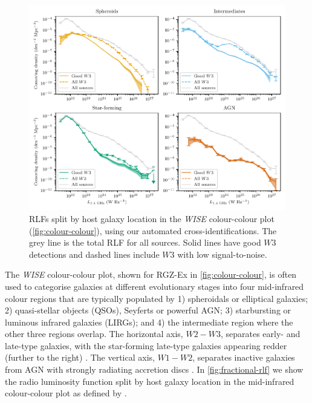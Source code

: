 \documentclass[11pt, a4paper]{book}
\begin{document}
  \begin{figure}
      \centering
    \includegraphics[width=\linewidth]{rlf-images/frlf-ir-colours.pdf}
    \caption[RLFs split by \emph{WISE} colour regions.]{RLFs split by host galaxy
      location in the \emph{WISE} colour-colour plot (\autoref{fig:colour-colour}),
      using our automated cross-identifications. The grey line is the
      total RLF for all sources. Solid lines have good $W3$ detections and dashed lines include $W3$ with low signal-to-noise.
    \label{fig:fractional-rlf}}
  \end{figure}

      The \emph{WISE} colour-colour plot, shown for RGZ-Ex in
      \autoref{fig:colour-colour}, is often used to categorise galaxies at different evolutionary stages into
      four mid-infrared colour regions that are typically populated by 1)
      spheroidals or elliptical galaxies; 2) quasi-stellar objects (QSOs),
      Seyferts or powerful AGN; 3) starbursting or luminous infrared galaxies
      (LIRGs); and 4) the intermediate region where the other three regions
      overlap. The horizontal axis, $W2-W3$, separates early- and late-type galaxies, with the star-forming late-type galaxies appearing redder (further to the right) \citep{wright10wise}. The vertical axis, $W1-W2$, separates inactive galaxies from AGN
      with strongly radiating accretion discs \citep{sadler14radio}. In
      \autoref{fig:fractional-rlf} we show the radio luminosity function split
      by host galaxy location in the mid-infrared colour-colour plot as defined by \citet{jarrett17wise}.
\end{document}
